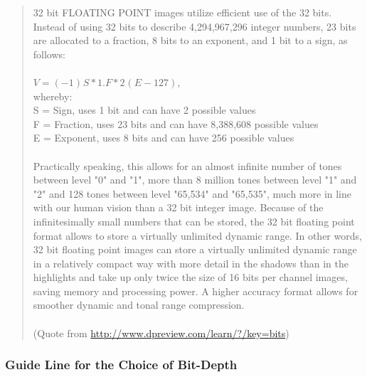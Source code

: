 \begin{quotation}
32 bit FLOATING POINT images utilize efficient use of the 32 bits.
Instead of using 32 bits to describe 4,294,967,296 integer numbers, 23
bits are allocated to a fraction, 8 bits to an exponent, and 1 bit to a
sign, as follows:\\
~\\
$V = (-1)^{}S * 1.F * 2^{}(E-127)$,\\ 
whereby:\\
S = Sign, uses 1 bit and can have 2 possible values\\
F = Fraction, uses 23 bits and can have 8,388,608 possible
values\\
E = Exponent, uses 8 bits and can have 256 possible values\\
~\\
Practically speaking, this allows for an almost infinite number of tones
between level "0" and
"1", more than 8 million tones between
level "1" and
"2" and 128 tones between level
"65,534" and
"65,535", much more in line with our human
vision than a 32 bit integer image. Because of the infinitesimally
small numbers that can be stored, the 32 bit floating point format
allows to store a virtually unlimited dynamic range. In other words, 32
bit floating point images can store a virtually unlimited dynamic range
in a relatively compact way with more detail in the shadows than in the
highlights and take up only twice the size of 16 bits per channel
images, saving memory and processing power. A higher accuracy format
allows for smoother dynamic and tonal range compression.\\
\\
(Quote from \url{http://www.dpreview.com/learn/?/key=bits})
\end{quotation}

\subsubsection{Guide Line for the Choice of Bit-Depth}


